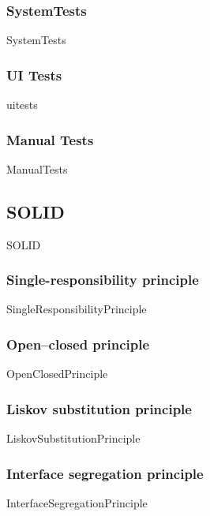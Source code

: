 \documentclass{article}
\begin{document}
        \subsubsection{SystemTests}
            {SystemTests}

        \subsubsection{UI Tests}
            {uitests}

        \subsubsection{Manual Tests}
            {ManualTests}

    \subsection{SOLID}
        {SOLID}

        \subsubsection{Single-responsibility principle}
        \label{kap:SRP}
            {SingleResponsibilityPrinciple}
        
        \subsubsection{Open–closed principle}
            {OpenClosedPrinciple}
        
        \subsubsection{Liskov substitution principle}
            {LiskovSubstitutionPrinciple}
        
        \subsubsection{Interface segregation principle}
        \label{kap:ISP}
            {InterfaceSegregationPrinciple}
        
\end{document}
